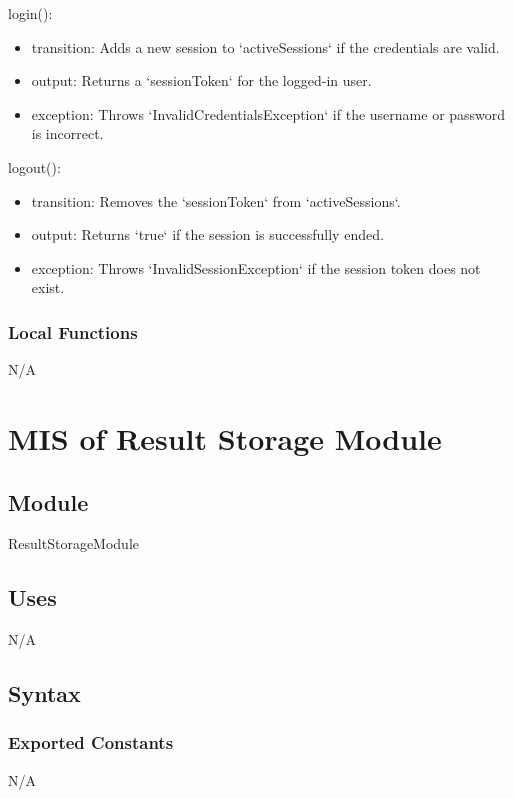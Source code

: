 \documentclass[12pt, titlepage]{article}
\begin{document}
\noindent login():
\begin{itemize}
\item transition: Adds a new session to `activeSessions` if the credentials are valid.
\item output: Returns a `sessionToken` for the logged-in user.
\item exception: Throws `InvalidCredentialsException` if the username or password is incorrect.
\end{itemize}

\noindent logout():
\begin{itemize}
\item transition: Removes the `sessionToken` from `activeSessions`.
\item output: Returns `true` if the session is successfully ended.
\item exception: Throws `InvalidSessionException` if the session token does not exist.
\end{itemize}

\subsubsection{Local Functions}

N/A
\section{MIS of Result Storage Module} \label{ResultStorageModule}

\subsection{Module}

ResultStorageModule

\subsection{Uses}

N/A

\subsection{Syntax}

\subsubsection{Exported Constants}

N/A
\end{document}

